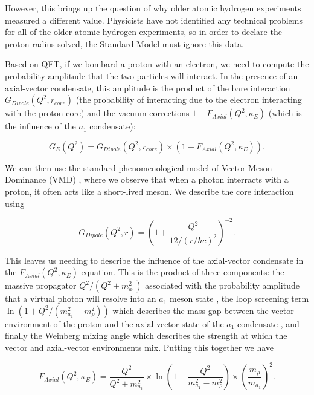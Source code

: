 However, this brings up the question of why older atomic hydrogen experiments measured a different value. Physicists have not identified any technical problems for all of the older atomic hydrogen experiments, so in order to declare the proton radius solved, the Standard Model must ignore this data.

Based on QFT, if we bombard a proton with an electron, we need to compute the probability amplitude that the two particles will interact. In the presence of an axial-vector condensate, this amplitude is the product of the bare interaction $G_{Dipole}(Q^2, r_{core})$ (the probability of interacting due to the electron interacting with the proton core) and the vacuum corrections $1 - F_{Axial}(Q^2, \kappa_E)$ (which is the influence of the $a_1$ condensate):

\begin{equation}
    G_E(Q^2) = G_{Dipole}(Q^2, r_{core}) \times ( 1 - F_{Axial}(Q^2, \kappa_E) ).
\end{equation}

\noindent We can then use the standard phenomenological model of Vector Meson Dominance (VMD) \citep{bodek2008vector}, where we observe that when a photon interracts with a proton, it often acts like a short-lived meson. We describe the core interaction using

\begin{equation}
    G_{Dipole}(Q^2, r) = \left( 1 + \frac{Q^2}{12 / (r / \hbar c)^2} \right)^{-2}.
\end{equation}

This leaves us needing to describe the influence of the axial-vector condensate in the $F_{Axial}(Q^2, \kappa_E)$ equation. This is the product of three components: the massive propagator $Q^2 / (Q^2 + m_{a_1}^2)$ associated with the probability amplitude that a virtual photon will resolve into an $a_1$ meson state \citep{guichon1983axial}, the loop screening term $\ln(1 + Q^2 / (m_{a_1}^2 - m_\rho^2))$ which describes the mass gap between the vector environment of the proton and the axial-vector state of the $a_1$ condensate \citep{coleman1973radiative, gross1973asymptotically}, and finally the Weinberg mixing angle \citep{weinberg1967precise} which describes the strength at which the vector and axial-vector environments mix. Putting this together we have

\begin{equation}
    F_{Axial}(Q^2, \kappa_E) = \frac{Q^2}{Q^2 + m_{a_1}^2} \times \ln\left( 1 + \frac{Q^2}{m_{a_1}^2 - m_\rho^2} \right) \times \left( \frac{m_\rho}{m_{a_1}} \right)^2 .
\end{equation}

